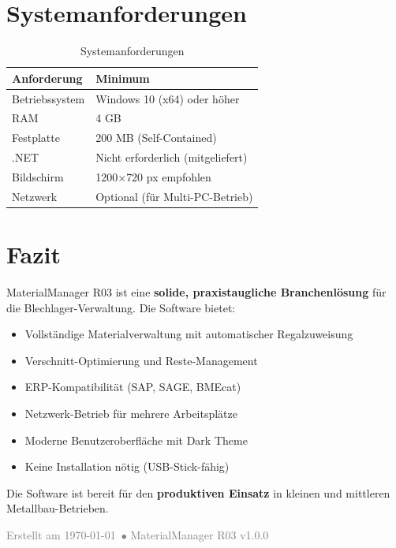 \documentclass[a4paper,12pt]{article}
\begin{document}
\section{Systemanforderungen}

\begin{table}[h]
\centering
\begin{tabularx}{\textwidth}{l X}
\toprule
\textbf{Anforderung} & \textbf{Minimum} \\
\midrule
Betriebssystem & Windows 10 (x64) oder höher \\
RAM & 4 GB \\
Festplatte & 200 MB (Self-Contained) \\
.NET & Nicht erforderlich (mitgeliefert) \\
Bildschirm & 1200$\times$720 px empfohlen \\
Netzwerk & Optional (für Multi-PC-Betrieb) \\
\bottomrule
\end{tabularx}
\caption{Systemanforderungen}
\end{table}

\section{Fazit}

\begin{successbox}[Zusammenfassung]
MaterialManager R03 ist eine \textbf{solide, praxistaugliche Branchenlösung} für die Blechlager-Verwaltung. Die Software bietet:

\begin{itemize}
    \item Vollständige Materialverwaltung mit automatischer Regalzuweisung
    \item Verschnitt-Optimierung und Reste-Management
    \item ERP-Kompatibilität (SAP, SAGE, BMEcat)
    \item Netzwerk-Betrieb für mehrere Arbeitsplätze
    \item Moderne Benutzeroberfläche mit Dark Theme
    \item Keine Installation nötig (USB-Stick-fähig)
\end{itemize}

Die Software ist bereit für den \textbf{produktiven Einsatz} in kleinen und mittleren Metallbau-Betrieben.
\end{successbox}

\vspace{1cm}

\begin{center}
\textcolor{gray}{\small Erstellt am \today\ $\bullet$ MaterialManager R03 v1.0.0}
\end{center}
\end{document}
